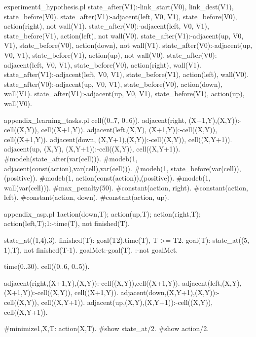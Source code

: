 \begin{filecontents*}{experiment4_hypothesis.pl}
state_after(V1):-link_start(V0), link_dest(V1), 
                 state_before(V0).
state_after(V1):-adjacent(left, V0, V1), state_before(V0), 
                 action(right), not wall(V1).
state_after(V0):-adjacent(left, V0, V1), state_before(V1), 
                 action(left), not wall(V0).
state_after(V1):-adjacent(up, V0, V1), state_before(V0), 
                 action(down), not wall(V1).
state_after(V0):-adjacent(up, V0, V1), state_before(V1), 
                 action(up), not wall(V0).
state_after(V0):-adjacent(left, V0, V1), state_before(V0), 
                 action(right), wall(V1).
state_after(V1):-adjacent(left, V0, V1), state_before(V1), 
                 action(left), wall(V0).
state_after(V0):-adjacent(up, V0, V1), state_before(V0), 
                 action(down), wall(V1).
state_after(V1):-adjacent(up, V0, V1), state_before(V1), 
                 action(up), wall(V0).  
\end{filecontents*}

\begin{filecontents*}{appendix_learning_tasks.pl}
cell((0..7, 0..6)).
adjacent(right, (X+1,Y),(X,Y)):-cell((X,Y)), cell((X+1,Y)).
adjacent(left,(X,Y),  (X+1,Y)):-cell((X,Y)), cell((X+1,Y)).
adjacent(down, (X,Y+1),(X,Y)):-cell((X,Y)), cell((X,Y+1)).
adjacent(up,   (X,Y),  (X,Y+1)):-cell((X,Y)), cell((X,Y+1)).
#modeh(state_after(var(cell))).
#modeb(1, adjacent(const(action),var(cell),var(cell))).
#modeb(1, state_before(var(cell)),(positive)).
#modeb(1, action(const(action)),(positive)).
#modeb(1, wall(var(cell))).
#max_penalty(50).
#constant(action, right).
#constant(action, left).
#constant(action, down).
#constant(action, up).
\end{filecontents*}

\begin{filecontents*}{appendix_asp.pl}
1{action(down,T);
  action(up,T);
  action(right,T);
  action(left,T);}1:-time(T), not finished(T).

state_at((1,4),3).
finished(T):-goal(T2),time(T), T >= T2.
goal(T):-state_at((5, 1),T), not finished(T-1).
goalMet:-goal(T).
:-not goalMet.

time(0..30).
cell((0..6, 0..5)).

adjacent(right,(X+1,Y),(X,Y)):-cell((X,Y)),cell((X+1,Y)).
adjacent(left,(X,Y),(X+1,Y)):-cell((X,Y)), cell((X+1,Y)).
adjacent(down,(X,Y+1),(X,Y)):-cell((X,Y)), cell((X,Y+1)).
adjacent(up,(X,Y),(X,Y+1)):-cell((X,Y)), cell((X,Y+1)).

#minimize{1,X,T: action(X,T)}.
#show state_at/2.
#show action/2.
\end{filecontents*}